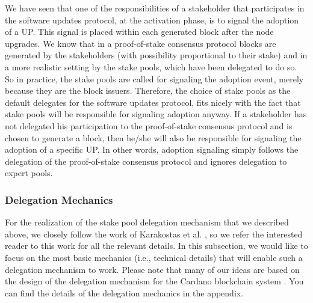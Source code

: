 We have seen that one of the responsibilities of a stakeholder that participates in the software updates protocol, at the activation phase, is to signal the adoption of a UP. This signal is placed within each generated block after the node upgrades. We know that in a proof-of-stake consensus protocol blocks are generated by the stakeholders (with possibility proportional to their stake) and in a more realistic setting by the stake pools, which have been delegated to do so. So in practice, the stake pools are called for signaling the adoption event, merely because they are the block issuers. Therefore, the choice of stake pools as the default delegates for the software updates protocol, fits nicely with the fact that stake pools will be responsible for signaling adoption anyway. If a stakeholder has not delegated his participation to the proof-of-stake consensus protocol and is chosen to generate a block, then he/she will also be responsible for signaling the adoption of a specific UP. In other words, adoption signaling simply follows the delegation of the proof-of-stake consensus protocol and ignores delegation to expert pools.

\subsubsection{Delegation Mechanics}
For the realization of the stake pool delegation mechanism that we described above, we closely follow the work of Karakostas et al. \cite{stakepools}, so we refer the interested reader to this work for all the relevant details. In this subsection, we would like to focus
on the most basic mechanics (i.e., technical details) that will enable such a delegation mechanism to work. Please note that many of our ideas are based on the design of the delegation mechanism for the Cardano blockchain system \cite{deldesign}. You can find the details of the delegation mechanics in the appendix.


